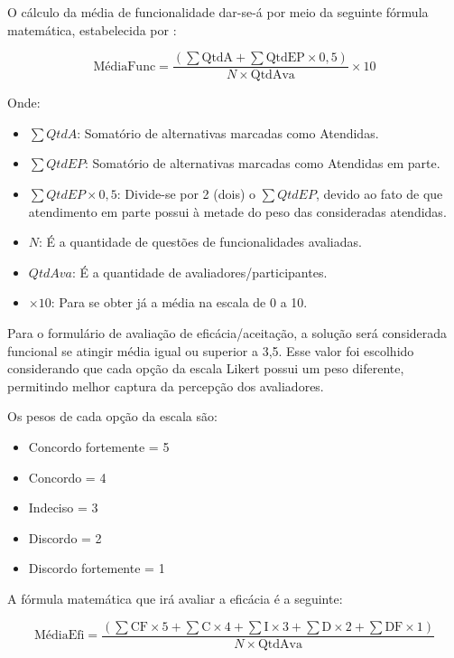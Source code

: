 O cálculo da média de funcionalidade dar-se-á por meio da seguinte fórmula matemática, estabelecida por \textcite{campagnaro2017}:

\begin{equation}
\text{MédiaFunc} = \frac{(\sum \text{QtdA} + \sum \text{QtdEP} \times 0,5)}{N \times \text{QtdAva}} \times 10
\end{equation}

Onde: 
\begin{itemize}
    \item $\sum QtdA$: Somatório de alternativas marcadas como Atendidas.
    \item $\sum QtdEP$: Somatório de alternativas marcadas como Atendidas em parte.
    \item $\sum QtdEP \times 0,5$: Divide-se por 2 (dois) o $\sum QtdEP$, devido ao fato de que atendimento em parte possui à metade do peso das consideradas atendidas.
    \item $N$: É a quantidade de questões de funcionalidades avaliadas.
    \item $QtdAva$: É a quantidade de avaliadores/participantes.
    \item $\times 10$: Para se obter já a média na escala de 0 a 10.
\end{itemize}

Para o formulário de avaliação de eficácia/aceitação, a solução será considerada funcional se atingir média igual ou superior a 3,5. Esse valor foi escolhido considerando que cada opção da escala Likert possui um peso diferente, permitindo melhor captura da percepção dos avaliadores.

Os pesos de cada opção da escala são:
\begin{itemize}
    \item Concordo fortemente = 5
    \item Concordo = 4
    \item Indeciso = 3
    \item Discordo = 2
    \item Discordo fortemente = 1
\end{itemize}

A fórmula matemática que irá avaliar a eficácia é a seguinte:

\begin{equation}
\text{MédiaEfi} = \frac{(\sum \text{CF} \times 5 + \sum \text{C} \times 4 + \sum \text{I} \times 3 + \sum \text{D} \times 2 + \sum \text{DF} \times 1)}{N \times \text{QtdAva}}
\end{equation}

